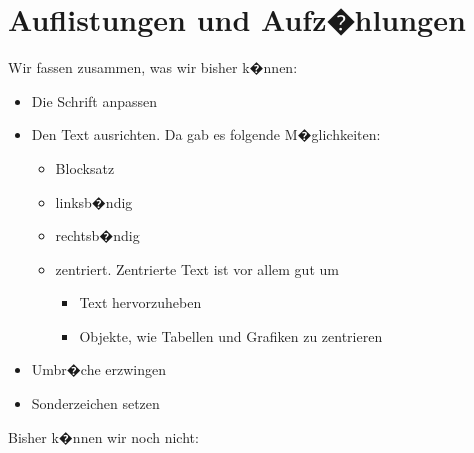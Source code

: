 \documentclass[11pt,a4paper]{article} %
\begin{document}

\section{Auflistungen und Aufz�hlungen}
\label{Listen}


Wir fassen zusammen, was wir bisher k�nnen:

\begin{itemize}
 \item Die Schrift anpassen
 \item Den Text ausrichten. Da gab es folgende M�glichkeiten:
    \begin{itemize}
        \item Blocksatz
        \item linksb�ndig
        \item rechtsb�ndig
        \item zentriert. Zentrierte Text ist vor allem gut um
            \begin{itemize}
                \item Text hervorzuheben
                \item Objekte, wie Tabellen und Grafiken zu zentrieren
            \end{itemize}
    \end{itemize}
 \item Umbr�che erzwingen
 \item Sonderzeichen setzen
\end{itemize}

Bisher k�nnen wir noch nicht:
\end{document}
